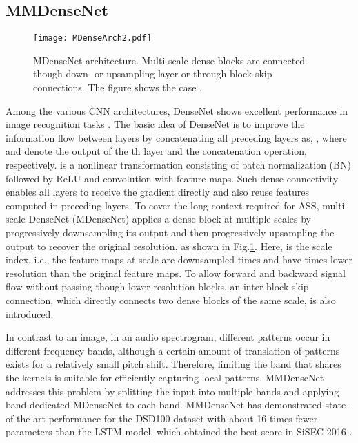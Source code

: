 \documentclass{article}
\begin{document}
\subsection{MMDenseNet}
\label{sec:MMDenseNet}
\begin{figure}[t]
\centering
\texttt{[image: MDenseArch2.pdf]}
\caption{MDenseNet architecture. Multi-scale dense blocks are connected though down- or upsampling layer or through block skip connections. The figure shows the case .}
\label{fig:mdense}
\end{figure}
Among the various CNN architectures, DenseNet shows excellent performance in image recognition tasks \cite{Huang2016}. The basic idea of DenseNet is to improve the information flow between layers by concatenating all preceding layers as,
,
where  and  denote the output of the th layer and the concatenation operation, respectively.   is a nonlinear transformation consisting of batch normalization (BN) followed by ReLU and convolution with  feature maps. Such dense connectivity enables all layers to receive the gradient directly and also reuse features computed in preceding layers. To cover the long context required for ASS, multi-scale DenseNet (MDenseNet) applies a dense block at multiple scales by progressively downsampling its output and then progressively upsampling the output to recover the original resolution, as shown in Fig.\ref{fig:mdense}. Here,  is the scale index, i.e., the feature maps at scale  are downsampled  times and have  times lower resolution than the original feature maps. To allow forward and backward signal flow without passing though lower-resolution blocks, an inter-block skip connection, which directly connects two dense blocks of the same scale, is also introduced. 

In contrast to an image, in an audio spectrogram, different patterns occur in different frequency bands, although a certain amount of translation of patterns exists for a relatively small pitch shift. Therefore, limiting the band that shares the kernels is suitable for efficiently capturing local patterns. MMDenseNet addresses this problem by splitting the input into multiple bands and applying band-dedicated MDenseNet to each band.  
MMDenseNet has demonstrated state-of-the-art performance for the DSD100 dataset with about 16 times fewer parameters than the LSTM model, which obtained the best score in SiSEC 2016 \cite{Liutkus17}. 

\label{sec:MMDenseNet}
\end{document}
